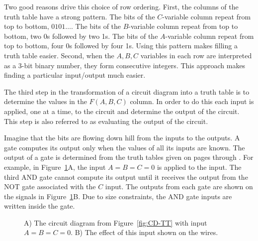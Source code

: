 Two good reasons drive this choice of row ordering.
First, the columns of the truth table have a strong pattern.
The bits of the $C$-variable column repeat from top to bottom, $0 1 0 1 \ldots$.
The bits of the $B$-variable column repeat from top to bottom, two 0s followed by two 1s.
The bits of the $A$-variable column repeat from top to bottom, four 0s followed by four 1s.
Using this pattern makes filling a truth table easier.  Second,
when the $A,B,C$ variables in each row are interpreted as a 
3-bit binary number, they form consecutive integers.  This approach
makes finding a particular input/output much easier.

The third step in the transformation of a circuit diagram into a 
truth table is to determine the values in the $F(A,B,C)$ column.  
In order to do this each input is applied, one at a time, to 
the circuit and determine the output of the circuit.  This step is also
referred to as evaluating the output of the circuit.  

Imagine that 
the bits are flowing down hill from the inputs to the outputs.  A 
gate computes its output only when the values of all its inputs
are known.  The output of a gate is determined from the truth tables
given on pages \pageref{page:elf1} through \pageref{page:elf2}.  For example,
in Figure~\ref{fig:cd-tt2}A, the input $A=B=C=0$ is applied
to the input.  The third AND gate cannot compute its output until
it receives the output from the NOT gate associated with the $C$ 
input.  The outputs from each gate are shown on the signals in
Figure~\ref{fig:cd-tt2}B.  Due to size constraints, the AND gate 
inputs are written inside the gate.  

\begin{figure}[ht]
\caption{A) The circuit diagram from Figure~\ref{fig:CD-TT} with
input $A=B=C=0$.  B) The effect of this input shown on the wires.}
\label{fig:cd-tt2}
\end{figure}

